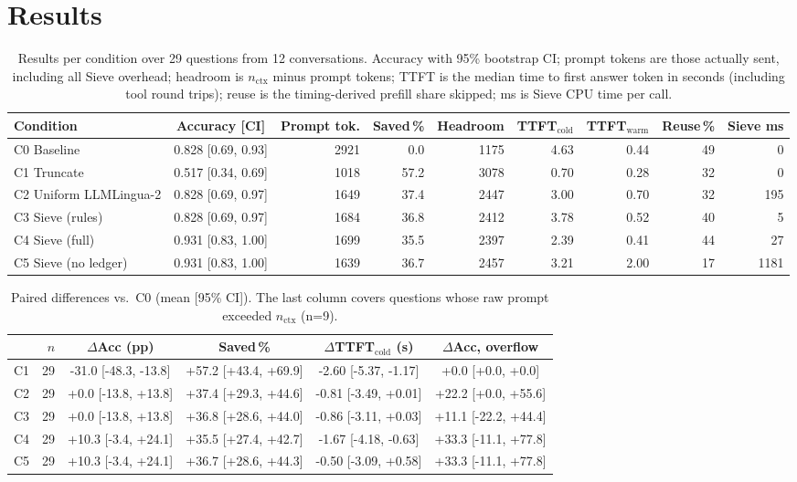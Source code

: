 \documentclass[journal]{IEEEtran}
\begin{document}
\section{Results}
\begin{table}[t]\centering
\caption{Results per condition over 29 questions from 12 conversations. Accuracy with 95\% bootstrap CI; prompt tokens are those
actually sent, including all Sieve overhead; headroom is $n_\text{ctx}$ minus prompt tokens; TTFT is the median time to first answer token in
seconds (including tool round trips); reuse is the timing-derived prefill share skipped; ms is Sieve CPU time per call.}\label{tab:main}
\footnotesize
\begin{tabular}{lcrrrrrrr}\toprule
Condition & Accuracy [CI] & Prompt tok. & Saved\,\% & Headroom & TTFT$_\text{cold}$ & TTFT$_\text{warm}$ & Reuse\,\% & Sieve ms\\\midrule
C0 Baseline & 0.828 [0.69, 0.93] & 2921 & 0.0 & 1175 & 4.63 & 0.44 & 49 & 0 \\
C1 Truncate & 0.517 [0.34, 0.69] & 1018 & 57.2 & 3078 & 0.70 & 0.28 & 32 & 0 \\
C2 Uniform LLMLingua-2 & 0.828 [0.69, 0.97] & 1649 & 37.4 & 2447 & 3.00 & 0.70 & 32 & 195 \\
C3 Sieve (rules) & 0.828 [0.69, 0.97] & 1684 & 36.8 & 2412 & 3.78 & 0.52 & 40 & 5 \\
C4 Sieve (full) & 0.931 [0.83, 1.00] & 1699 & 35.5 & 2397 & 2.39 & 0.41 & 44 & 27 \\
C5 Sieve (no ledger) & 0.931 [0.83, 1.00] & 1639 & 36.7 & 2457 & 3.21 & 2.00 & 17 & 1181 \\
\bottomrule\end{tabular}\end{table}

\begin{table}[t]\centering
\caption{Paired differences vs.\ C0 (mean [95\% CI]). The last column covers questions whose raw prompt exceeded $n_\text{ctx}$
(n=9).}\label{tab:paired}\scriptsize\setlength{\tabcolsep}{2pt}
\begin{tabular}{lrcccc}\toprule
 & $n$ & $\Delta$Acc (pp) & Saved\,\% & $\Delta$TTFT$_\text{cold}$ (s) & $\Delta$Acc, overflow\\\midrule
C1 & 29 & -31.0 [-48.3, -13.8] & +57.2 [+43.4, +69.9] & -2.60 [-5.37, -1.17] & +0.0 [+0.0, +0.0] \\
C2 & 29 & +0.0 [-13.8, +13.8] & +37.4 [+29.3, +44.6] & -0.81 [-3.49, +0.01] & +22.2 [+0.0, +55.6] \\
C3 & 29 & +0.0 [-13.8, +13.8] & +36.8 [+28.6, +44.0] & -0.86 [-3.11, +0.03] & +11.1 [-22.2, +44.4] \\
C4 & 29 & +10.3 [-3.4, +24.1] & +35.5 [+27.4, +42.7] & -1.67 [-4.18, -0.63] & +33.3 [-11.1, +77.8] \\
C5 & 29 & +10.3 [-3.4, +24.1] & +36.7 [+28.6, +44.3] & -0.50 [-3.09, +0.58] & +33.3 [-11.1, +77.8] \\
\bottomrule\end{tabular}\end{table}
\end{document}
